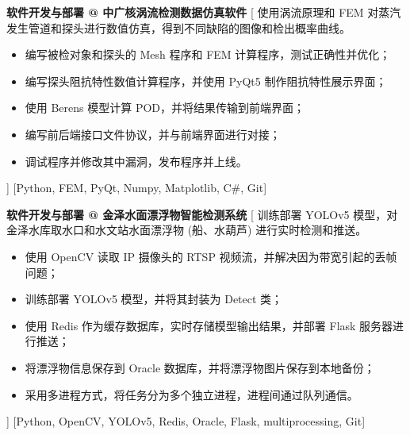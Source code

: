 \documentclass[zh]{resume}
\begin{document}
\begin{experiences}
    {\textbf{软件开发与部署 @ 中广核涡流检测数据仿真软件}}%
    [
    使用涡流原理和 FEM 对蒸汽发生管道和探头进行数值仿真，得到不同缺陷的图像和检出概率曲线。
        \begin{itemize}
            \item {编写被检对象和探头的 Mesh 程序和 FEM 计算程序，测试正确性并优化；}
            \item {编写探头阻抗特性数值计算程序，并使用 PyQt5 制作阻抗特性展示界面；}
            \item {使用 Berens 模型计算 POD，并将结果传输到前端界面；}
            \item {编写前后端接口文件协议，并与前端界面进行对接；}
            \item {调试程序并修改其中漏洞，发布程序并上线。}
        \end{itemize}
    ]
    [Python, FEM, PyQt, Numpy, Matplotlib, C\#, Git]
    \separator{0.5ex}

    {\textbf{软件开发与部署 @ 金泽水面漂浮物智能检测系统}}%
    [
    训练部署 YOLOv5 模型，对金泽水库取水口和水文站水面漂浮物 (船、水葫芦) 进行实时检测和推送。
        \begin{itemize}
            \item {使用 OpenCV 读取 IP 摄像头的 RTSP 视频流，并解决因为带宽引起的丢帧问题；}
            \item {训练部署 YOLOv5 模型，并将其封装为 Detect 类；}
            \item {使用 Redis 作为缓存数据库，实时存储模型输出结果，并部署 Flask 服务器进行推送；}
            \item {将漂浮物信息保存到 Oracle 数据库，并将漂浮物图片保存到本地备份；}
            \item {采用多进程方式，将任务分为多个独立进程，进程间通过队列通信。}
        \end{itemize}]
    [Python, OpenCV, YOLOv5, Redis, Oracle, Flask, multiprocessing, Git]
\end{experiences}
\end{document}
